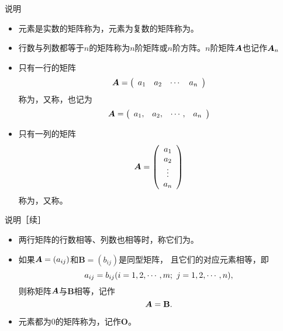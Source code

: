 \begin{frame}
  \begin{small}
    \begin{block}{说明}
      \begin{itemize}
    \item 
      元素是实数的矩阵称为，元素为复数的矩阵称为。\\[0.3cm] \pause 
    \item
      行数与列数都等于$n$的矩阵称为$n$阶矩阵或$n$阶方阵。$n$阶矩阵$\boldsymbol{A}$也记作$\boldsymbol{A}_n$ \\[0.3cm]\pause
    \item
      只有一行的矩阵
      $$
      \boldsymbol{A} = \left(
      \begin{array}{cccc}
        a_1 & a_2 & \cdots & a_n
      \end{array}
      \right )
      $$
      称为，又称，也记为
      $$
      \boldsymbol{A} = \left(
      \begin{array}{cccc}
        a_1, & a_2, & \cdots, & a_n
      \end{array}
      \right )
      $$\pause
    \item
      只有一列的矩阵
      $$
      \boldsymbol{A} = \left(
      \begin{array}{c}
        a_1 \\
        a_2 \\
        \vdots \\
        a_n
      \end{array}
      \right )
      $$
      称为，又称。

    \end{itemize}

    \end{block}
    
  \end{small}
\end{frame}


\begin{frame}
  \begin{small}
    \begin{block}{说明［续］}
      
    \begin{itemize}
    \item 
      两行矩阵的行数相等、列数也相等时，称它们为。\\[0.3cm] \pause
    \item
      如果$\boldsymbol{A}=(a_{ij})$和$\mathbf{B}=(b_{ij})$是同型矩阵，
      且它们的对应元素相等，即
      $$
      a_{ij} = b_{ij}(i=1,2,\cdots,m; \ j =1,2,\cdots,n),
      $$
      则称矩阵$\boldsymbol{A}$与$\mathbf{B}$相等，记作
      $$
      \boldsymbol{A} = \mathbf{B}.
      $$\pause
    \item
      元素都为0的矩阵称为，记作{$\mathbf{O}$}。\\[0.2cm] \pause 
    \end{itemize}

    \end{block}
  \end{small}
\end{frame}

